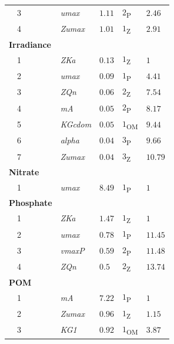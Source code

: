 \documentclass[letterpaper,12pt,oneside]{article}\usepackage[]{graphicx}\usepackage[]{color}
\begin{document}
\begin{table}[!tbp]
{\begin{center}
\begin{tabular}{lllll}
~~3&\scriptsize{\textit{umax}}&$1.11$&$2$\textsubscript{P}&$2.46$\tabularnewline
~~4&\scriptsize{\textit{Zumax}}&$1.01$&$1$\textsubscript{Z}&$2.91$\tabularnewline
\hline
{\bfseries Irradiance}&&&&\tabularnewline
~~1&\scriptsize{\textit{ZKa}}&$0.13$&$1$\textsubscript{Z}&$1$\tabularnewline
~~2&\scriptsize{\textit{umax}}&$0.09$&$1$\textsubscript{P}&$4.41$\tabularnewline
~~3&\scriptsize{\textit{ZQn}}&$0.06$&$2$\textsubscript{Z}&$7.54$\tabularnewline
~~4&\scriptsize{\textit{mA}}&$0.05$&$2$\textsubscript{P}&$8.17$\tabularnewline
~~5&\scriptsize{\textit{KGcdom}}&$0.05$&$1$\textsubscript{OM}&$9.44$\tabularnewline
~~6&\scriptsize{\textit{alpha}}&$0.04$&$3$\textsubscript{P}&$9.66$\tabularnewline
~~7&\scriptsize{\textit{Zumax}}&$0.04$&$3$\textsubscript{Z}&$10.79$\tabularnewline
\hline
{\bfseries Nitrate}&&&&\tabularnewline
~~1&\scriptsize{\textit{umax}}&$8.49$&$1$\textsubscript{P}&$1$\tabularnewline
\hline
{\bfseries Phosphate}&&&&\tabularnewline
~~1&\scriptsize{\textit{ZKa}}&$1.47$&$1$\textsubscript{Z}&$1$\tabularnewline
~~2&\scriptsize{\textit{umax}}&$0.78$&$1$\textsubscript{P}&$11.45$\tabularnewline
~~3&\scriptsize{\textit{vmaxP}}&$0.59$&$2$\textsubscript{P}&$11.48$\tabularnewline
~~4&\scriptsize{\textit{ZQn}}&$0.5$&$2$\textsubscript{Z}&$13.74$\tabularnewline
\hline
{\bfseries POM}&&&&\tabularnewline
~~1&\scriptsize{\textit{mA}}&$7.22$&$1$\textsubscript{P}&$1$\tabularnewline
~~2&\scriptsize{\textit{Zumax}}&$0.96$&$1$\textsubscript{Z}&$1.15$\tabularnewline
~~3&\scriptsize{\textit{KG1}}&$0.92$&$1$\textsubscript{OM}&$3.87$\tabularnewline
\hline
\end{tabular}\end{center}}

\end{table}
\end{document}
